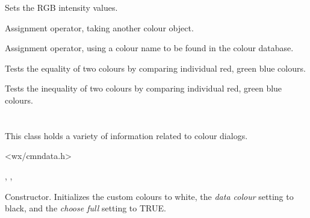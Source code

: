 Sets the RGB intensity values.

\label{wxcolourassign}


Assignment operator, taking another colour object.


Assignment operator, using a colour name to be found in the colour database.



\label{wxcolourequality}


Tests the equality of two colours by comparing individual red, green blue colours.

\label{wxcolourinequality}


Tests the inequality of two colours by comparing individual red, green blue colours.

\section{}\label{wxcolourdata}

This class holds a variety of information related to colour dialogs.




<wx/cmndata.h>


, , 


\label{wxcolourdataconstr}


Constructor. Initializes the custom colours to white, the {\it data colour} setting
to black, and the {\it choose full} setting to TRUE.

